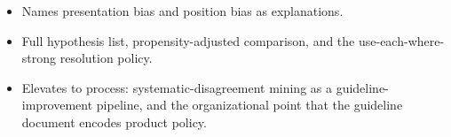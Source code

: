 \begin{interviewq}

\goodgreat
\begin{itemize}
    \item {} Names presentation bias and position bias as explanations.
    \item {} Full hypothesis list, propensity-adjusted comparison, and the use-each-where-strong resolution policy.
    \item {} Elevates to process: systematic-disagreement mining as a guideline-improvement pipeline, and the organizational point that the guideline document encodes product policy.
\end{itemize}

\end{interviewq}

